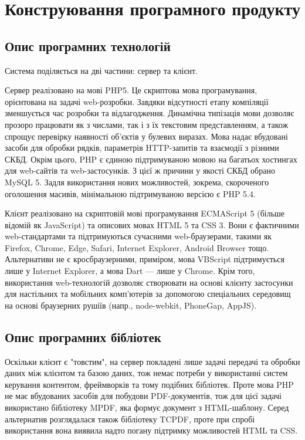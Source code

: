 \newpage
\section{Конструювання програмного продукту}
\subsection{Опис програмних технологій}
\bigbreak
Система поділяється на дві частини: сервер та клієнт.

Сервер реалізовано на мові PHP5. Це скриптова мова програмування, орієнтована на задачі web-розробки. Завдяки відсутності етапу компіляції зменшується час розробки та відлагодження. Динамічна типізація мови дозволяє прозоро працювати як з числами, так і з їх текстовим представленням, а також спрощує перевірку наявності об'єктів у булевих виразах. Мова надає вбудовані засоби для обробки рядків, параметрів HTTP-запитів та взаємодії з різними СКБД. Окрім цього, PHP є єдиною підтримуваною мовою на багатьох хостингах для web-сайтів та web-застосунків. З цієї ж причини у якості СКБД обрано MySQL 5. Задля використання нових можливостей, зокрема, скороченого оголошення масивів, мінімальною підтримуваною версією є PHP 5.4.

Клієнт реалізовано на скриптовій мові програмування ECMAScript 5 (більше відомій як JavaScript) та описових мовах HTML 5 та CSS 3. Вони є фактичними web-стандартами та підтримуються сучасними web-браузерами, такими як Firefox, Chrome, Edge, Safari, Internet Explorer, Android Browser тощо. Альтернативи не є кросбраузерними, приміром, мова VBScript підтримується лише у Internet Explorer, а мова Dart --- лише у Chrome. Крім того, використання web-технологій дозволяє створювати на основі клієнту застосунки для настільних та мобільних комп'ютерів за допомогою спеціальних середовищ на основі браузерних рушіїв (напр., node-webkit, PhoneGap, AppJS).
\bigbreak
\subsection{Опис програмних бібліотек}
\bigbreak
Оскільки клієнт є "товстим", на сервер покладені лише задачі передачі та обробки даних між клієнтом та базою даних, тож немає потреби у використанні систем керування контентом, фреймворків та тому подібних бібліотек. Проте мова PHP не має вбудованих засобів для побудови PDF-документів, тож для цієї задачі використано бібліотеку MPDF, яка формує документ з HTML-шаблону. Серед альтернатив розглядалася також бібліотеку TCPDF, проте при спробі використання вона виявила надто погану підтримку можливостей HTML та CSS.

